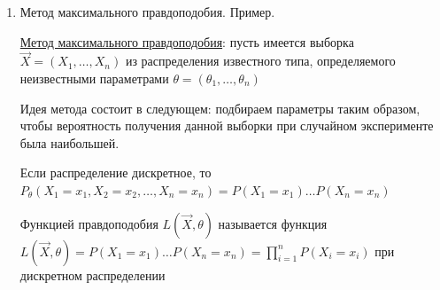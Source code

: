 \documentclass[12pt]{article}
\begin{document}
\begin{enumerate}
    \Ex Пусть $X \in U(a, b)$. Обработав статданные, нашли оценки первого и второго моментов: $\overline{x} = 2.25; \overline{x^2} = 6.75$. 
    Нужно найти оценки параметров $a^*, b^*$

    $EX = \int_a^b x \frac{1}{b - a} dx = \frac{a + b}{2}$

    $EX^2 = \int_a^b x^2 \frac{1}{b - a} dx = \frac{a^2 + ab + b^2}{3}$

    Получаем:

    $\begin{cases}
        \overline{x} = \frac{a^* + b^*}{2} \\ 
        \overline{x^2} = \frac{a^*^2 + a^* b^* + b^*^2}{3} \\ 
    \end{cases} \Longleftrightarrow \begin{cases}
        a^* + b^* = 4.5 \\ 
        a^*^2 + a^* b^* + b^*^2 = 20.25 \\ 
    \end{cases} \Longleftrightarrow \begin{cases}
        a^* + b^* = 4.5 \\ 
        a^* b^* = 0 \\ 
    \end{cases} \Longleftrightarrow \begin{cases}
        a^* = 0 \\ 
        b^* = 4.5 \\ 
    \end{cases}$

    \item Метод максимального правдоподобия. Пример.

    \hyperlink{maximum_likelihood_estimation}{Метод максимального правдоподобия}: пусть имеется выборка $\vec{X} = (X_1, \dots, X_n)$ из распределения известного типа, определяемого неизвестными параметрами 
    $\theta = (\theta_1, \dots, \theta_n)$

    Идея метода состоит в следующем: подбираем параметры таким образом, чтобы вероятность получения
    данной выборки при случайном эксперименте была наибольшей.

    Если распределение дискретное, то $P_{\theta} (X_1 = x_1, X_2 = x_2, \dots, X_n = x_n) = P(X_1 = x_1) \dots P(X_n = x_n)$

    \Defs Функцией правдоподобия $L(\vec{X}, \theta)$ называется функция $L(\vec{X}, \theta) = P(X_1 = x_1) \dots P(X_n = x_n) = \prod_{i = 1}^n P(X_i = x_i)$ при дискретном распределении


\end{enumerate}
\end{document}
